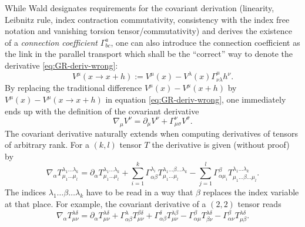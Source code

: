\documentclass[12pt,a4paper]{report}
\numberwithin{equation}{chapter}
\begin{document}
While Wald \cite[page 31]{WaldGR} designates requirements for the covariant derivation (linearity, Leibnitz rule, index contraction commutativity, consistency with the index free notation and vanishing torsion tensor/commutativity) and derives the existence of a \emph{connection coefficient} $\Gamma^a_{bc}$, one can also introduce the connection coefficient as the link in the parallel transport which shall be the ``correct'' way to denote the derivative \eqref{eq:GR-deriv-wrong}:%
\begin{equation}\label{eq:GR-connection-coefficient}
V^\mu(x \to x+h) := V^\mu(x) - V^\lambda(x)
\Gamma^\mu_{\nu\lambda} h^\nu.
\end{equation}
By replacing the traditional difference $V^\mu(x)-V^\mu(x+h)$ by $V^\mu(x) - V^\mu(x\to x+h)$ in equation \eqref{eq:GR-deriv-wrong}, one immediately ends up with the definition of the covariant derivative
\begin{equation}
\nabla_\mu V^\nu = \partial_\mu V^\nu + \Gamma^\nu_{\mu\sigma} V^\sigma.
\end{equation}
The covariant derivative naturally extends when computing derivatives of tensors of arbitrary rank. %
For a $(k,l)$ tensor $T$ the derivative is given (without proof) by
\begin{equation}
\nabla_\alpha
T^{\lambda_1 \dots \lambda_k}_{\mu_1 \dots \mu_l}
=
\partial_\alpha T^{\lambda_1 \dots \lambda_k}_{\mu_1 \dots \mu_l}
+
\sum_{i=1}^k
\Gamma^{\lambda_i}_{\alpha \beta}
T^{\lambda_1 \dots \beta \dots \lambda_k}_{\mu_1 \dots \mu_l}
-
\sum_{j=1}^l
\Gamma^{\beta}_{\alpha \mu_i}
T^{\lambda_1 \dots \lambda_k}_{\mu_1 \dots \beta \dots \mu_l}.
\end{equation}
The indices $\lambda_1\dots\beta\dots\lambda_k$ have to be read in a way that $\beta$ replaces the index variable at that place. For example, the covariant derivative of a $(2,2)$ tensor reads
\begin{equation}
\nabla_\alpha T^{\lambda\delta}_{\mu\nu}
= \partial_\alpha T^{\lambda\delta}_{\mu\nu}
+ \Gamma^\lambda_{\alpha\beta} T^{\beta\delta}_{\mu\nu}
+ \Gamma^\delta_{\alpha\beta} T^{\lambda\beta}_{\mu\nu}
- \Gamma^\beta_{\alpha\mu} T^{\lambda\delta}_{\beta\nu}
- \Gamma^\beta_{\alpha\nu} T^{\lambda\delta}_{\mu\beta}.
\end{equation}
\end{document}
